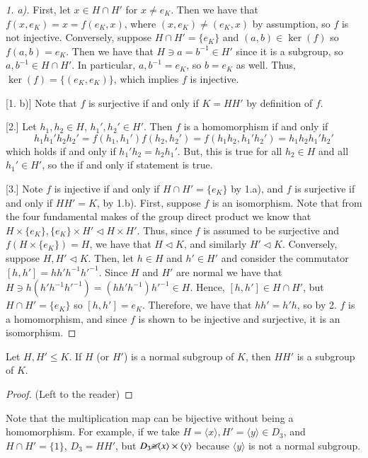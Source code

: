 \documentclass[12pt, a4paper, oneside, openright, titlepage]{book}
\begin{document}
\begin{proof}
        [1. a)] First, let $x \in H \cap H'$ for $x \neq e_K$. Then we have that $f(x,e_K) = x = f(e_K, x)$, where $(x,e_K) \neq (e_K, x)$ by assumption, so $f$ is not injective. Conversely, suppose $H \cap H' = \{e_K\}$ and $(a,b) \in \ker(f)$ so $f(a,b) = e_K$. Then we have that $H \ni a = b^{-1} \in H'$ since it is a subgroup, so $a, b^{-1} \in H \cap H'$. In particular, $a, b^{-1} = e_K$, so $b = e_K$ as well. Thus, $\ker(f) = \{(e_K,e_K)\}$, which implies $f$ is injective.

        [1. b)] Note that $f$ is surjective if and only if $K = HH'$ by definition of $f$. 

        [2.] Let $h_1,h_2 \in H$, $h_1',h_2' \in H'$. Then $f$ is a homomorphism if and only if $$h_1h_1'h_2h_2' = f(h_1,h_1')f(h_2,h_2') = f(h_1h_2,h_1'h_2') = h_1h_2h_1'h_2'$$
        which holds if and only if $h_1'h_2 = h_2h_1'$. But, this is true for all $h_2 \in H$ and all $h_1' \in H'$, so the if and only if statement is true.

        [3.] Note $f$ is injective if and only if $H \cap H' = \{e_K\}$ by 1.a), and $f$ is surjective if and only if $HH' = K$, by 1.b). First, suppose $f$ is an isomorphism. Note that from the four fundamental makes of the group direct product we know that $H \times \{e_K\},\{e_K\}\times H' \vartriangleleft H \times H'$. Thus, since $f$ is assumed to be surjective and $f(H\times \{e_K\}) = H$, we have that $H \vartriangleleft K$, and similarly $H' \vartriangleleft K$. Conversely, suppose $H, H' \vartriangleleft K$. Then, let $h \in H$ and $h' \in H'$ and consider the commutator $[h,h'] = hh'h^{-1}{h'}^{-1}$. Since $H$ and $H'$ are normal we have that $H \ni h(h'h^{-1}{h'}^{-1}) = (hh'h^{-1}){h'}^{-1} \in H$. Hence, $[h,h'] \in H \cap H'$, but $H \cap H' = \{e_K\}$ so $[h,h'] = e_K$. Therefore, we have that $hh' = h'h$, so by 2. $f$ is a homomorphism, and since $f$ is shown to be injective and surjective, it is an isomorphism.
\end{proof}

\begin{prop}
        Let $H,H' \leq K$. If $H$ (or $H'$) is a normal subgroup of $K$, then $HH'$ is a subgroup of $K$.
\end{prop}
\begin{proof}
        (Left to the reader)
\end{proof}

\begin{rmk}
        Note that the multiplication map can be bijective without being a homomorphism. For example, if we take $H = \langle x \rangle, H' = \langle y \rangle \in D_3$, and $H \cap H' = \{1\}$, $D_3 = HH'$, but $D_3 \cancel{\cong}\langle x \rangle \times \langle y \rangle$ because $\langle y \rangle $ is not a normal subgroup.
\end{rmk}
\end{document}
